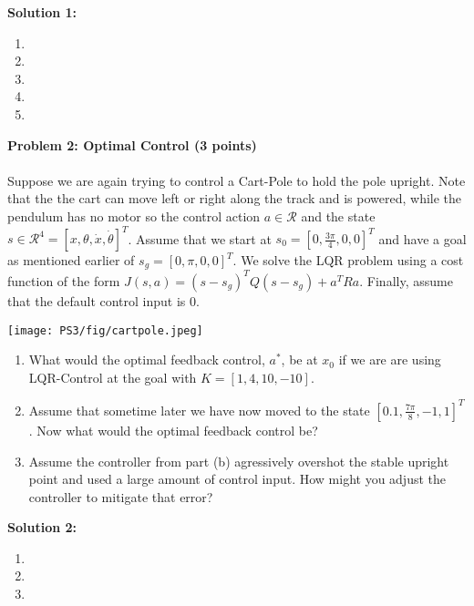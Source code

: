 \documentclass[]{article}
\begin{document}
\textbf{Solution 1:}
\begin{enumerate}[label=(\alph*)]
    \item %
    \item %
    \item %
    \item %
    \item %
\end{enumerate}

\clearpage
\textbf{Problem 2: Optimal Control (3 points)}\\\\
Suppose we are again trying to control a Cart-Pole to hold the pole upright. Note that the the cart can move left or right along the track and is powered, while the pendulum has no motor so the control action $a \in \mathcal{R}$ and the state $s\in \mathcal{R}^4 = [x,\theta,\dot{x},\dot{\theta}]^T$. Assume that we start at $s_0 = [0,\frac{3\pi}{4},0,0]^T$ and have a goal as mentioned earlier of $s_g = [0,\pi,0,0]^T$. We solve the LQR problem using a cost function of the form $J(s,a) = (s-s_g)^TQ(s-s_g) + a^TRa$. Finally, assume that the default control input is $0$.

\texttt{[image: PS3/fig/cartpole.jpeg]}

\begin{enumerate}[label=(\alph*)]
    \item What would the optimal feedback control, $a^*$, be at $x_0$ if we are are using LQR-Control at the goal with $K = [1,4,10,-10]$.
    \item Assume that sometime later we have now moved to the state $[0.1,\frac{7\pi}{8},-1,1]^T$. Now what would the optimal feedback control be?
    \item Assume the controller from part (b) agressively overshot the stable upright point and used a large amount of control input. How might you adjust the controller to mitigate that error?
\end{enumerate}

\textbf{Solution 2:}
\begin{enumerate}[label=(\alph*)]
    \item %
    \item %
    \item %
\end{enumerate}
\end{document}
